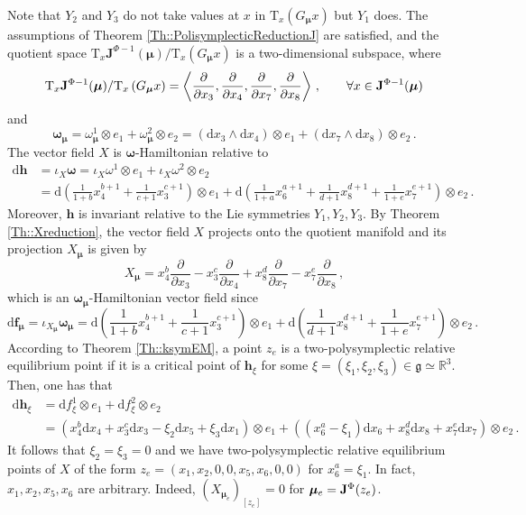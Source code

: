 \documentclass[11pt]{article}
\theoremstyle{plain}
\theoremstyle{definition}
\newcommand{\R}{\mathbb{R}}
\newcommand{\T}{\mathrm{T}}
\newcommand{\bomega}{{\boldsymbol{\omega}}}
\renewcommand{\d}{\mathrm{d}}
\newcommand{\parder}[2]{\frac{\partial #1}{\partial #2}}
\def\d{\mathrm{d}}
\numberwithin{equation}{section}
\begin{document}
Note that $Y_2$ and $Y_3$ do not take values at $x$ in  $\T_x(G_{\bm\mu}x)$ but $Y_1$ does. The assumptions of Theorem \ref{Th::PolisymplecticReductionJ} are satisfied, and the quotient space $\T_x\mathbf{J}^{\Phi-1}(\bm\mu)/\T_{x}\left(G_{\bm \mu}x\right)$ is a two-dimensional subspace, where
\[
    \T_x\mathbf{J}^{\Phi-1}(\bm\mu)/\T_{x}\left(G_{\bm \mu}x\right) = \left\langle\parder{}{x_3},\parder{}{x_4},\parder{}{x_7},\parder{}{x_8}\right\rangle\,,\qquad \forall x\in {\bf J}^{\Phi-1}(\bm{\mu})
\]
and
\[
    \bm\omega_{\bm\mu} = \omega^1_{\bm\mu}\otimes e_1+\omega^2_{\bm\mu}\otimes e_2 = (\d x_3\wedge \d x_4)\otimes e_1 + (\d x_7\wedge \d x_8)\otimes e_2\,.
\]
The vector field $X$ is $\bm\omega$-Hamiltonian relative to
\begin{align*}
\d \bm h &= \iota_X\bomega = \iota_X\omega^1\otimes e_1+\iota_X\omega^2\otimes e_2\\
&= \d\left(\frac{1}{1+b}x^{b+1}_4+\frac{1}{c+1}x_3^{c+1} \right)\otimes e_1+\d\left(\frac{1}{1+a}x^{a+1}_6+\frac{1}{d+1}x_8^{d+1}+\frac{1}{1+e}x_7^{e+1} \right)\otimes e_2\,.
\end{align*}
Moreover, $\bm h$ is invariant relative to the Lie symmetries $Y_1,Y_2,Y_3$. 
By Theorem \ref{Th::Xreduction}, the vector field $X$ projects onto the quotient manifold and its projection $X_{\bm{\mu}}$ is given by
\[
X_{\bm\mu} = x_4^b\parder{}{x_3}-x_3^c\parder{}{x_4}+x_8^d\parder{}{x_7}-x_7^e\parder{}{x_8}\,,
\]
which is an $\bm\omega_{\bm\mu}$-Hamiltonian vector field since
\[
    \d\bm f_{\bm\mu} = \iota_{X_{\bm\mu}}\bm\omega_{\bm\mu}=\d\left(\frac{1}{1+b}x^{b+1}_4+\frac{1}{c+1}x_3^{c+1} \right)\otimes e_1+\d\left(\frac{1}{d+1}x_8^{d+1}+\frac{1}{1+e}x_7^{e+1} \right)\otimes e_2\,.
\]
According to Theorem \ref{Th::ksymEM}, a point $z_e$ is a two-polysymplectic relative equilibrium point if it is a critical point of $\boldsymbol{h}_\xi$ for some $\xi=(\xi_1,\xi_2,\xi_3)\in \mathfrak{g}\simeq\R^3$. Then, one has that
\begin{align*}
    \d\bm h_\xi &= \d f^1_\xi\otimes e_1+\d f^2_\xi \otimes e_2\\
    &=\left(x_4^b \d x_4+x^c_3 \d x_3-\xi_2\d x_5+\xi_3 \d x_1\right)\otimes e_1+\left( (x^a_6-\xi_1)\d x_6 + x_8^d\d x_8 + x_7^e\d x_7 \right)\otimes e_2\,.
\end{align*}
It follows that $\xi_2=\xi_3=0$ and we have two-polysymplectic relative equilibrium points of $X$ of the form $z_e=(x_1,x_2,0,0,x_5,x_6,0,0)$ for $x^a_6=\xi_1$. In fact, $x_1,x_2,x_5,x_6$ are arbitrary. Indeed, $(X_{\bm\mu_e})_{[z_e]}=0$ for $\bm{\mu}_e={\bf J}^\Phi(z_e)$.
\end{document}
